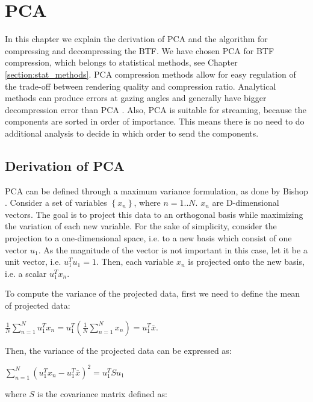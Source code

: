 \chapter{PCA}
\label{section:pca}


In this chapter we explain the derivation of PCA and the algorithm for compressing and decompressing the BTF.
We have chosen PCA for BTF compression, which belongs to statistical methods, see Chapter \ref{section:stat_methods}.
PCA compression methods allow for easy regulation of the trade-off between rendering quality and compression ratio.
Analytical methods can produce errors at gazing angles and generally have bigger decompression error than PCA \cite{haindl}.
Also, PCA is suitable for streaming, because the components are sorted in order of importance.
This means there is no need to do additional analysis to decide in which order to send the components.



 \section{Derivation of PCA}
\label{section:derivation_pca}

 PCA can be defined through a maximum variance formulation, as done by Bishop \cite{Bishop}.
 Consider a set of variables $\left \{ x_{n} \right \}$, where $n=1..N$. $x_{n}$ are D-dimensional vectors. The goal is to project this data to an orthogonal basis while maximizing the variation of each new variable.
For the sake of simplicity, consider the projection to a one-dimensional space, i.e. to a new basis which consist of one vector $u_{1}$. 
As the magnitude of the vector is not important in this case, let it be a unit vector, i.e. $u_{1}^Tu_{1}=1$.
 Then, each variable $x_{n}$ is projected onto the new basis, i.e. a scalar $u_{1}^Tx_{n}$.

 To compute the variance of the projected data, first we need to define the mean of projected data:

{\centering$\tfrac{1}{N}\sum_{n=1}^{N}u_{1}^Tx_{n}=u_{1}^T(\tfrac{1}{N}\sum_{n=1}^{N}x_{n})=u_{1}^T\overline{x}.$\\}

Then, the variance of the projected data can be expressed as:

{\centering$\sum_{n=1}^{N}(u_{1}^Tx_{n}-u_{1}^T\overline{x} )^2=u_{1}^TSu_{1}$\\}

where $S$ is the covariance matrix defined as:

